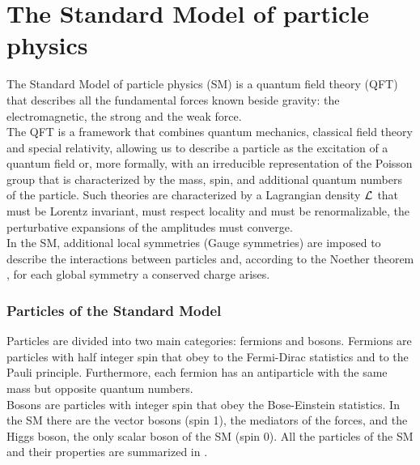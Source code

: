 \label{sec:TH}
\minitoc
\section{The Standard Model of particle physics}

The Standard Model of particle physics (SM) is a quantum field theory (QFT) that describes all the fundamental forces known beside gravity: the electromagnetic, the strong and the weak force. \\
The QFT is a framework that combines quantum mechanics, classical field theory and special relativity, allowing us to describe a particle as the excitation of a quantum field or, more formally, with an irreducible representation of the Poisson group that is characterized by the mass, spin, and additional quantum numbers of the particle.
Such theories are characterized by a Lagrangian density $\mathcal{L}_\text{}$ that must be Lorentz invariant, must respect locality and must be renormalizable, \ie the perturbative expansions of the amplitudes must converge. \\
In the SM, additional local symmetries (Gauge symmetries) are imposed to describe the interactions between particles and, according to the Noether theorem \cite{NoetherInvarianteVariationsprobleme}, for each global symmetry a conserved charge arises.

\subsubsection*{Particles of the Standard Model}
Particles are divided into two main categories: fermions and bosons. 
Fermions are particles with half integer spin that obey to the Fermi-Dirac statistics and to the Pauli principle. 
Furthermore, each fermion has an antiparticle with the same mass but opposite quantum numbers.\\
Bosons are particles with integer spin that obey the Bose-Einstein statistics. In the SM there are the vector bosons (spin 1), the mediators of the forces, and the Higgs boson, the only scalar boson of the SM (spin 0). All the particles of the SM and their properties are summarized in .



